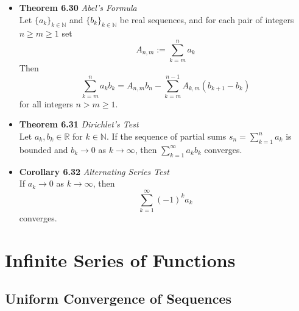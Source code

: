 \documentclass[11pt,a4paper]{article}
\begin{document}
\begin{itemize}
    \item \textbf{Theorem 6.30} \emph{Abel's Formula} \\
        Let ${\{a_k\}}_{k \in \mathbb{N}}$ and ${\{b_k\}}_{k \in \mathbb{N}}$ be real
        sequences, and for each pair of integers $n \geq m \geq 1$ set
        \[
            A_{n, m} := \sum_{k=m}^n a_k
        \]
        Then
        \[
            \sum_{k=m}^n a_k b_k = A_{n, m} b_n - \sum_{k=m}^{n-1} A_{k, m} (b_{k+1} - b_k)
        \]
        for all integers $n > m \geq 1$.

    \item \textbf{Theorem 6.31} \emph{Dirichlet's Test} \\
        Let $a_k, b_k \in \mathbb{R}$ for $k \in \mathbb{N}$.
        If the sequence of partial sums $s_n = \sum_{k=1}^n a_k$ is bounded and
        $b_k \to 0$ as $k \to \infty$, then $\sum_{k=1}^\infty a_k b_k$ converges.

    \item \textbf{Corollary 6.32} \emph{Alternating Series Test} \\
        If $a_k \to 0$ as $k \to \infty$, then
        \[
            \sum_{k=1}^\infty {(-1)}^k a_k
        \]
        converges.

\end{itemize}

\break{}

\section{Infinite Series of Functions}

\subsection{Uniform Convergence of Sequences}
\end{document}

